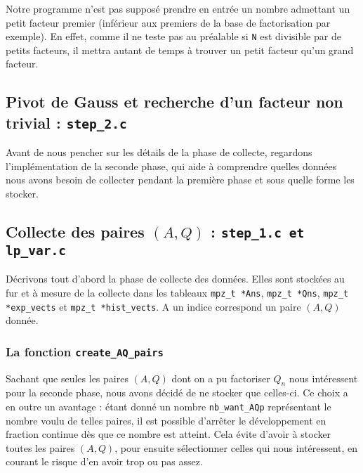 \begin{remarque}
Notre programme n'est pas supposé prendre en entrée un nombre admettant un petit
facteur premier (inférieur aux premiers de la base de factorisation par exemple).
En effet, comme il ne teste pas au préalable si \texttt{N} est divisible par de 
petits facteurs, il mettra autant de temps à trouver un petit facteur qu'un
grand facteur.
\end{remarque}


\subsection{Pivot de Gauss et recherche d'un facteur non trivial
            : \texttt{step\_2.c}}

Avant de nous pencher sur les détails de la phase de collecte, regardons 
l'implémentation de la seconde phase, qui aide à comprendre quelles
données nous avons besoin de collecter pendant la première phase et sous 
quelle forme les stocker.

\subsection{Collecte des paires $(A,Q)$ : \texttt{step\_1.c et lp\_var.c}}

Décrivons tout d'abord  la phase de collecte
des données. Elles sont stockées au fur et à mesure de la collecte dans les 
tableaux \texttt{mpz\_t *Ans}, \texttt{mpz\_t *Qns}, \texttt{mpz\_t *exp\_vects}
et \texttt{mpz\_t *hist\_vects}. A un indice correspond un paire $(A,Q)$ donnée.\\ 

\subsubsection{La fonction \texttt{create\_AQ\_pairs}}

Sachant que seules les paires $(A,Q)$ dont on a pu factoriser $Q_n$ nous
intéressent pour la seconde phase, nous avons décidé de ne stocker que celles-ci.
Ce choix a en outre un avantage : étant donné un nombre \texttt{nb\_want\_AQp}
représentant le nombre voulu de telles paires, il est possible d'arrêter le 
développement en fraction continue dès que ce nombre est atteint. Cela évite
d'avoir à stocker toutes les paires $(A,Q)$, pour ensuite sélectionner celles 
qui nous intéressent, en courant le risque d'en avoir trop ou pas assez. \\

